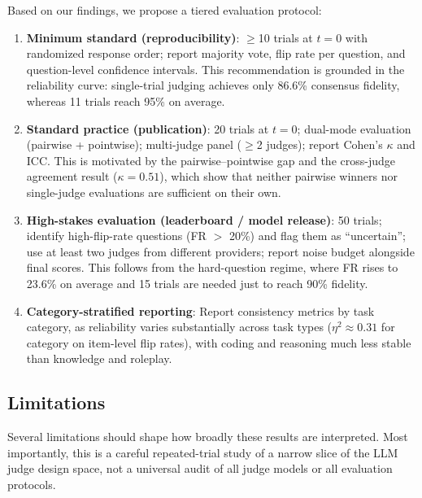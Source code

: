 \documentclass{ijclclp}
\begin{document}
Based on our findings, we propose a tiered evaluation protocol:

\begin{enumerate}[nosep]
    \item \textbf{Minimum standard (reproducibility)}: $\geq$10 trials at $t=0$ with randomized response order; report majority vote, flip rate per question, and question-level confidence intervals. This recommendation is grounded in the reliability curve: single-trial judging achieves only 86.6\% consensus fidelity, whereas 11 trials reach 95\% on average.
    \item \textbf{Standard practice (publication)}: 20 trials at $t=0$; dual-mode evaluation (pairwise + pointwise); multi-judge panel ($\geq$2 judges); report Cohen's $\kappa$ and ICC. This is motivated by the pairwise--pointwise gap and the cross-judge agreement result ($\kappa = 0.51$), which show that neither pairwise winners nor single-judge evaluations are sufficient on their own.
    \item \textbf{High-stakes evaluation (leaderboard / model release)}: 50 trials; identify high-flip-rate questions (FR $>$ 20\%) and flag them as ``uncertain''; use at least two judges from different providers; report noise budget alongside final scores. This follows from the hard-question regime, where FR rises to 23.6\% on average and 15 trials are needed just to reach 90\% fidelity.
    \item \textbf{Category-stratified reporting}: Report consistency metrics by task category, as reliability varies substantially across task types ($\eta^2 \approx 0.31$ for category on item-level flip rates), with coding and reasoning much less stable than knowledge and roleplay.
\end{enumerate}

\subsection{Limitations}

Several limitations should shape how broadly these results are interpreted. Most importantly, this is a careful repeated-trial study of a narrow slice of the LLM judge design space, not a universal audit of all judge models or all evaluation protocols.
\end{document}
